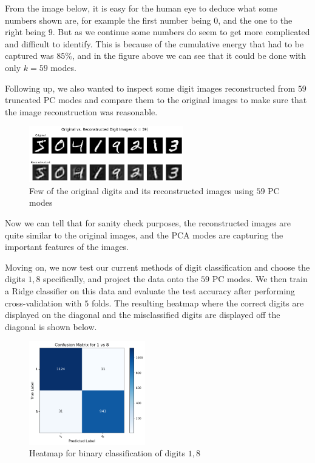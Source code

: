 \documentclass[11pt]{amsart}
\begin{document}
From the image below, it is easy for the human eye to deduce what some numbers shown are, for example the first number being $0$, and the one to the right being $9$. But as we continue some numbers do seem to get more complicated and difficult to identify. This is because of the cumulative energy that had to be captured was $85\%$, and in the figure above we can see that it could be done with only $k = 59$ modes.

Following up, we also wanted to inspect some digit images reconstructed from $59$ truncated PC modes and compare them to the original images to make sure that the image reconstruction was reasonable.

\begin{figure}[H]
    \centering
    \includegraphics[width=0.6\textwidth]{OGvsReconstructed.png}
    \caption{Few of the original digits and its reconstructed images using $59$ PC modes}
    \label{fig:reconstruction}
\end{figure}

Now we can tell that for sanity check purposes, the reconstructed images are quite similar to the original images, and the PCA modes are capturing the important features of the images.



Moving on, we now test our current methods of digit classification and choose the digits $1, 8$ specifically, and project the data onto the $59$ PC modes. We then train a Ridge classifier on this data and evaluate the test accuracy after performing cross-validation with $5$ folds. The resulting heatmap where the correct digits are displayed on the diagonal and the misclassified digits are displayed off the diagonal is shown below.

\begin{figure}[H]
    \centering
    \includegraphics[width=0.45\textwidth]{Confusion1v8.png}
    \caption{Heatmap for binary classification of digits $1, 8$}
    \label{fig:1vs8}
\end{figure}
\end{document}
